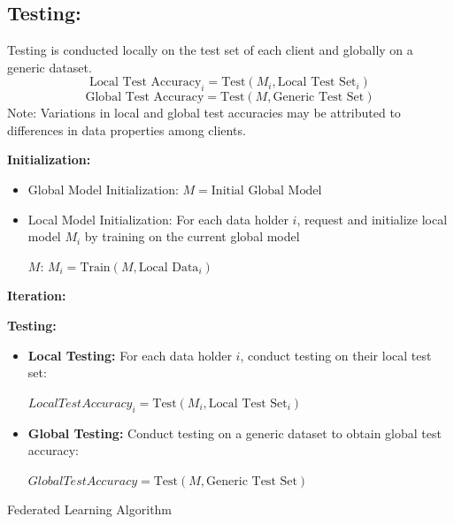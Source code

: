 \documentclass[conference]{IEEEtran}
\begin{document}
\subsection{Testing:}
Testing is conducted locally on the test set of each client and globally on a generic dataset.
\[ \text{Local Test Accuracy}_i = \text{Test}(M_i, \text{Local Test Set}_i) \]
\[ \text{Global Test Accuracy} = \text{Test}(M, \text{Generic Test Set}) \]
Note: Variations in local and global test accuracies may be attributed to differences in data properties among clients.
\begin{algorithm}[H]
\begin{scriptsize}  
    
    \textbf{Initialization:}
    \begin{itemize}
        \item Global Model Initialization: $M = \text{Initial Global Model}$
        \item Local Model Initialization: For each data holder $i$, request and initialize local model $M_i$ by training on the current global model 
        
        $M$: $M_i = \text{Train}(M, \text{Local Data}_i)$
    \end{itemize}
    
    \textbf{Iteration:}
    
    \textbf{Testing:}
    \begin{itemize}
        \item \textbf{Local Testing:} For each data holder $i$, conduct testing on their local test set:

        $Local Test Accuracy_i = \text{Test}(M_i, \text{Local Test Set}_i)$
        \item \textbf{Global Testing:} Conduct testing on a generic dataset to obtain global test accuracy: 
        
        $Global Test Accuracy = \text{Test}(M, \text{Generic Test Set})$
    \end{itemize}
    
    \caption{Federated Learning Algorithm}
\end{scriptsize}
    
\end{algorithm}
\end{document}
